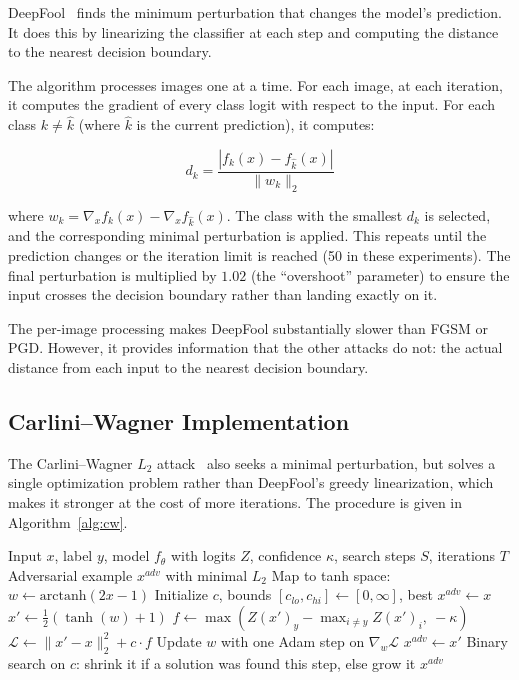 DeepFool~\cite{moosavidezfooli2016deepfool} finds the minimum perturbation that changes the model's prediction. It does this by linearizing the classifier at each step and computing the distance to the nearest decision boundary.

The algorithm processes images one at a time. For each image, at each iteration, it computes the gradient of every class logit with respect to the input. For each class $k \neq \hat{k}$ (where $\hat{k}$ is the current prediction), it computes:

\begin{equation}
    d_k = \frac{|f_k(x) - f_{\hat{k}}(x)|}{\|w_k\|_2}
\end{equation}

where $w_k = \nabla_x f_k(x) - \nabla_x f_{\hat{k}}(x)$. The class with the smallest $d_k$ is selected, and the corresponding minimal perturbation is applied. This repeats until the prediction changes or the iteration limit is reached (50 in these experiments). The final perturbation is multiplied by $1.02$ (the ``overshoot'' parameter) to ensure the input crosses the decision boundary rather than landing exactly on it.

The per-image processing makes DeepFool substantially slower than FGSM or PGD. However, it provides information that the other attacks do not: the actual distance from each input to the nearest decision boundary.

\subsection{Carlini--Wagner Implementation}

The Carlini--Wagner $L_2$ attack~\cite{carlini2017towards} also seeks a minimal perturbation, but solves a single optimization problem rather than DeepFool's greedy linearization, which makes it stronger at the cost of more iterations. The procedure is given in Algorithm~\ref{alg:cw}.

\begin{algorithm}[htbp]
\caption{Carlini--Wagner $L_2$ Attack}
\label{alg:cw}
\begin{algorithmic}[1]
\REQUIRE Input $x$, label $y$, model $f_\theta$ with logits $Z$, confidence $\kappa$, search steps $S$, iterations $T$
\ENSURE Adversarial example $x^{adv}$ with minimal $L_2$
\STATE Map to tanh space: $w \gets \text{arctanh}(2x - 1)$
\STATE Initialize $c$, bounds $[c_{lo}, c_{hi}] \gets [0, \infty]$, best $x^{adv} \gets x$
        \STATE $x' \gets \tfrac{1}{2}(\tanh(w) + 1)$
        \STATE $f \gets \max\!\left(Z(x')_y - \max_{i \neq y} Z(x')_i,\ -\kappa\right)$
        \STATE $\mathcal{L} \gets \|x' - x\|_2^2 + c \cdot f$
        \STATE Update $w$ with one Adam step on $\nabla_w \mathcal{L}$
            \STATE $x^{adv} \gets x'$
        \ENDIF
    \ENDFOR
    \STATE Binary search on $c$: shrink it if a solution was found this step, else grow it
\ENDFOR
\RETURN $x^{adv}$
\end{algorithmic}
\end{algorithm}

